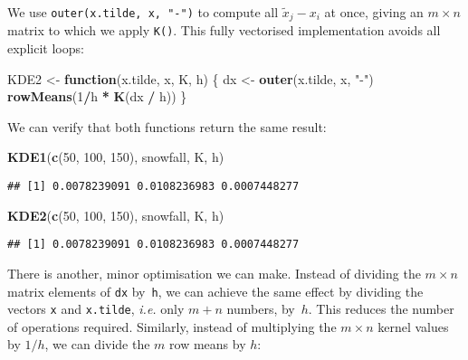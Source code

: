 \documentclass[
  a4paper,
]{article}
\newenvironment{Shaded}{\begin{snugshade}}{\end{snugshade}}
\newcommand{\ControlFlowTok}[1]{\textcolor[rgb]{0.13,0.29,0.53}{\textbf{#1}}}
\newcommand{\DecValTok}[1]{\textcolor[rgb]{0.00,0.00,0.81}{#1}}
\newcommand{\FunctionTok}[1]{\textcolor[rgb]{0.13,0.29,0.53}{\textbf{#1}}}
\newcommand{\NormalTok}[1]{#1}
\newcommand{\OtherTok}[1]{\textcolor[rgb]{0.56,0.35,0.01}{#1}}
\newcommand{\SpecialCharTok}[1]{\textcolor[rgb]{0.81,0.36,0.00}{\textbf{#1}}}
\newcommand{\StringTok}[1]{\textcolor[rgb]{0.31,0.60,0.02}{#1}}
\theoremstyle{definition}
\theoremstyle{definition}
\theoremstyle{definition}
\theoremstyle{definition}
\theoremstyle{remark}
\begin{document}
We use \texttt{outer(x.tilde,\ x,\ "-")} to compute all \(\tilde x_j - x_i\) at once,
giving an \(m \times n\) matrix to which we apply \texttt{K()}. This fully vectorised
implementation avoids all explicit loops:

\begin{Shaded}
\begin{Highlighting}[]
\NormalTok{KDE2 }\OtherTok{\textless{}{-}} \ControlFlowTok{function}\NormalTok{(x.tilde, x, K, h) \{}
\NormalTok{  dx }\OtherTok{\textless{}{-}} \FunctionTok{outer}\NormalTok{(x.tilde, x, }\StringTok{"{-}"}\NormalTok{)}
  \FunctionTok{rowMeans}\NormalTok{(}\DecValTok{1}\SpecialCharTok{/}\NormalTok{h }\SpecialCharTok{*} \FunctionTok{K}\NormalTok{(dx }\SpecialCharTok{/}\NormalTok{ h))}
\NormalTok{\}}
\end{Highlighting}
\end{Shaded}

We can verify that both functions return the same result:

\begin{Shaded}
\begin{Highlighting}[]
\FunctionTok{KDE1}\NormalTok{(}\FunctionTok{c}\NormalTok{(}\DecValTok{50}\NormalTok{, }\DecValTok{100}\NormalTok{, }\DecValTok{150}\NormalTok{), snowfall, K, h)}
\end{Highlighting}
\end{Shaded}

\begin{verbatim}
## [1] 0.0078239091 0.0108236983 0.0007448277
\end{verbatim}

\begin{Shaded}
\begin{Highlighting}[]
\FunctionTok{KDE2}\NormalTok{(}\FunctionTok{c}\NormalTok{(}\DecValTok{50}\NormalTok{, }\DecValTok{100}\NormalTok{, }\DecValTok{150}\NormalTok{), snowfall, K, h)}
\end{Highlighting}
\end{Shaded}

\begin{verbatim}
## [1] 0.0078239091 0.0108236983 0.0007448277
\end{verbatim}

There is another, minor optimisation we can make. Instead of dividing the
\(m\times n\) matrix elements of \texttt{dx} by~\texttt{h}, we can achieve the same effect by
dividing the vectors \texttt{x} and \texttt{x.tilde}, \emph{i.e.} only \(m+n\) numbers, by~\(h\).
This reduces the number of operations required. Similarly, instead of
multiplying the \(m\times n\) kernel values by \(1/h\), we can divide the \(m\) row
means by \(h\):
\end{document}
